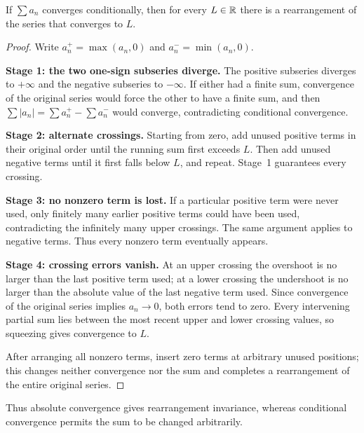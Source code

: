 \begin{theorem}
\label{thm:conditional-rearrangement}
If \(\sum a_n\) converges conditionally, then for every \(L\in\mathbb{R}\) there is
a rearrangement of the series that converges to \(L\).
\end{theorem}
\begin{proof}
Write $a_n^+=\max(a_n,0)$ and $a_n^-=\min(a_n,0)$.

\textbf{Stage 1: the two one-sign subseries diverge.}
The positive subseries diverges to $+\infty$ and the negative subseries to
$-\infty$. If either had a finite sum, convergence of the original series
would force the other to have a finite sum, and then
$\sum|a_n|=\sum a_n^+-\sum a_n^-$ would converge, contradicting
conditional convergence.

\textbf{Stage 2: alternate crossings.}
Starting from zero, add unused positive terms in their original order until
the running sum first exceeds $L$. Then add unused negative terms until it
first falls below $L$, and repeat. Stage~1 guarantees every crossing.

\textbf{Stage 3: no nonzero term is lost.}
If a particular positive term were never used, only finitely many earlier
positive terms could have been used, contradicting the infinitely many
upper crossings. The same argument applies to negative terms. Thus every
nonzero term eventually appears.

\textbf{Stage 4: crossing errors vanish.}
At an upper crossing the overshoot is no larger than the last positive term
used; at a lower crossing the undershoot is no larger than the absolute
value of the last negative term used. Since convergence of the original
series implies $a_n\to0$, both errors tend to zero. Every intervening
partial sum lies between the most recent upper and lower crossing values,
so squeezing gives convergence to $L$.

After arranging all nonzero terms, insert zero terms at arbitrary unused
positions; this changes neither convergence nor the sum and completes a
rearrangement of the entire original series.
\end{proof}

Thus absolute convergence gives rearrangement invariance, whereas
conditional convergence permits the sum to be changed arbitrarily.

